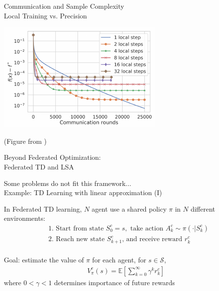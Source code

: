 \documentclass[aspectratio=169,14pt]{beamer}
\begin{document}

\begin{frame}{Communication and Sample Complexity\\[-0.5em]
    \large Local Training vs. Precision}
  
  \vspace{-1em}
  
  \begin{center}
    \includegraphics[width=0.6\linewidth]{images/comm-vs-local.pdf}
  \end{center}

  \vspace{-1em}

  \footnotesize
  (Figure from )
\end{frame}


\begin{frame}
  \begin{center}
    \textcolor{beamer@blendedblue}{
      \huge Beyond Federated Optimization:\\[0.5em]
      \huge Federated TD and LSA
    }
  \end{center}
\end{frame}


\begin{frame}{Some problems do not fit this framework...\\[-0.5em]
    \large Example: TD Learning with linear approximation (I)}

  In Federated TD learning, $N$ agent use a shared policy $\pi$ in $N$ different environments:
  \begin{align*}
    & \text{1. Start from state } S_0^c= s,
      \text{ take action } A_k^c \sim \pi(\cdot | S_k^c)
    \\
    & \text{2. Reach new state } S_{k+1}^c%
      \text{, and receive reward } r_k^{c}
    \\
  \end{align*}

  \pause
  \vspace{-1em}
  
  Goal: estimate the value of $\pi$ for each agent, for $s \in \mathcal{S}$,
  \begin{align*}
    V^{c}_{\pi}(s) = \textstyle{\mathbb{E}\left[\sum_{k=0}^{\infty}\gamma^{k} r_k^{c} \right]}
  \end{align*}
  where $0 < \gamma < 1$ determines importance of future rewards
\end{frame}
\end{document}
